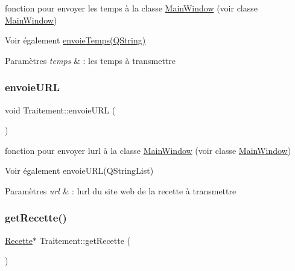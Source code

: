 fonction pour envoyer les temps à la classe \hyperlink{classMainWindow}{Main\+Window} (voir classe \hyperlink{classMainWindow}{Main\+Window}) 

\begin{DoxySeeAlso}{Voir également}
\hyperlink{classTraitement_ae57543af34e05b74a7af460c0e74e87f}{envoie\+Temps(\+Q\+String)} 
\end{DoxySeeAlso}

\begin{DoxyParams}{Paramètres}
{\em temps} & \+: les temps à transmettre \\
\hline
\end{DoxyParams}
\mbox{\label{classTraitement_acc099bf1113669c2e061e8897c3eaeca}} 
\subsubsection{\texorpdfstring{envoie\+U\+RL}{envoieURL}}
{\footnotesize\ttfamily void Traitement\+::envoie\+U\+RL (\begin{DoxyParamCaption}\item[{Q\+String}]{ }\end{DoxyParamCaption})\hspace{0.3cm}{\ttfamily [signal]}}



fonction pour envoyer l\textquotesingle{}url à la classe \hyperlink{classMainWindow}{Main\+Window} (voir classe \hyperlink{classMainWindow}{Main\+Window}) 

\begin{DoxySeeAlso}{Voir également}
envoie\+U\+R\+L(\+Q\+String\+List) 
\end{DoxySeeAlso}

\begin{DoxyParams}{Paramètres}
{\em url} & \+: l\textquotesingle{}url du site web de la recette à transmettre \\
\hline
\end{DoxyParams}
\mbox{\label{classTraitement_aba3c99b92a3b6d429e4479294267af9d}} 
\subsubsection{\texorpdfstring{get\+Recette()}{getRecette()}}
{\footnotesize\ttfamily \hyperlink{classRecette}{Recette}$\ast$ Traitement\+::get\+Recette (\begin{DoxyParamCaption}{ }\end{DoxyParamCaption})\hspace{0.3cm}{\ttfamily [inline]}}

